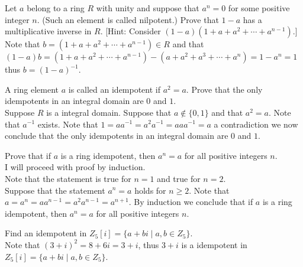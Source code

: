 \documentclass[12pt]{article}
\makeatletter
\theoremstyle{homework}
\newenvironment{exercise}[1]
{\def\@currentlabel{#1}\exercisecore}
{\endexercisecore}
\makeatother
\begin{document}
\begin{exercise}{13.15}
Let $a$ belong to a ring $R$ with unity and suppose that $a^n = 0$ for some positive integer $n$. (Such an element is called nilpotent.) Prove that $1 - a$ has a multiplicative inverse in $R$. [Hint: Consider $(1 - a)(1 + a + a^2 +\cdots +a^{n-1} )$.]\\
Note that $b=(1 + a + a^2 +\cdots +a^{n-1} )\in R$ and that $(1-a)b=(1 + a + a^2 +\cdots +a^{n-1} )-(a + a^2 + a^3 +\cdots +a^{n} )=1-a^n=1$ thus $b=(1-a)^{-1}$.
\end{exercise}

\begin{exercise}{13.18}
A ring element $a$ is called an idempotent if $a^2 = a$. Prove that the only idempotents in an integral domain are $0$ and $1$.\\
Suppose $R$ is a integral domain.  Suppose that $a\not\in \{0,1\}$ and that $a^2=a$.  Note that $a^{-1}$ exists.  Note that $1=aa^{-1}=a^2a^{-1}=aaa^{-1}=a$ a contradiction we now conclude that the only idempotents in an integral domain are $0$ and $1$.
\end{exercise}

\begin{exercise}{13.22}
Prove that if $a$ is a ring idempotent, then $a^n=a$ for all positive integers $n$.\\
I will proceed with proof by induction.\\
Note that the statement is true for $n=1$ and true for $n=2$.\\
Suppose that the statement $a^n=a$ holds for $n\geq 2$.  Note that $a=a^n=aa^{n-1}=a^2a^{n-1}=a^{n+1}$.  By induction we conclude that if $a$ is a ring idempotent, then $a^n=a$ for all positive integers $n$.
\end{exercise}

\begin{exercise}{13.25}
Find an idempotent in $Z_5 [i] = \{a + bi \mid a, b \in Z_5 \}$.\\
Note that $(3+i)^2=8+6i=3+i$, thus $3+i$ is a idempotent in $Z_5 [i] = \{a + bi \mid a, b \in Z_5 \}$.
\end{exercise}
\end{document}
